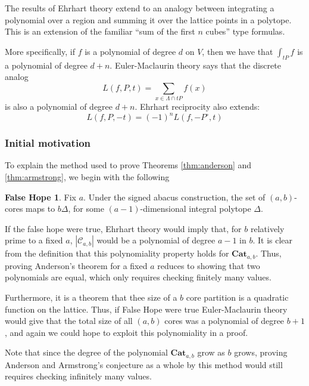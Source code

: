 \documentclass{amsart}[12pt]
\theoremstyle{definition}
\newtheorem{FalseHope}{False Hope}
\newcommand{\Cat}{\mathbf{Cat}}
\begin{document}
The results of Ehrhart theory extend to an analogy between integrating a polynomial over a region and summing it over the lattice points in a polytope.  This is an extension of the familiar ``sum of the first $n$ cubes'' type formulas.

More specifically, if $f$ is a polynomial of degree $d$ on $V$, then we have that $\int_{tP} f$ is a polynomial of degree $d+n$.  Euler-Maclaurin theory says that the discrete analog
 $$L(f, P, t)=\sum_{x\in\Lambda\cap tP} f(x)$$
is also a polynomial of degree $d+ n$. Ehrhart reciprocity also extends: $$L(f,P,-t)=(-1)^nL(f, -P^\circ, t)$$





\subsubsection{Initial motivation}
To explain the method used to prove Theorems \ref{thm:anderson} and \ref{thm:armstrong}, we begin with the following 

\begin{FalseHope}
Fix $a$.  Under the signed abacus construction, the set of $(a,b)$-cores maps to $b\Delta$, for some $(a-1)$-dimensional integral polytope $\Delta$.
\end{FalseHope}

  If the false hope were true, Ehrhart theory would imply that, for $b$ relatively prime to a fixed $a$, $|\mathcal{C}_{a,b}|$ would be a polynomial of degree $a-1$ in $b$.  It is clear from the definition that this polynomiality property holds for $\Cat_{a,b}$.  Thus, proving Anderson's theorem for a fixed $a$  reduces to showing that two polynomials are equal, which only requires checking finitely many values.  

Furthermore, it is a theorem that thee size of a $b$ core partition is a quadratic function on the lattice.  Thus, if False Hope  were true Euler-Maclaurin theory would give that the total size of all $(a,b)$ cores was a polynomial of degree $b+1$, and again we could hope to exploit this polynomiality in a proof.

Note that since the degree of the polynomial $\Cat_{a,b}$ grow as $b$ grows, proving Anderson and Armstrong's conjecture as a whole by this method would still requires checking infinitely many values.


\subsubsection{}
\end{document}
